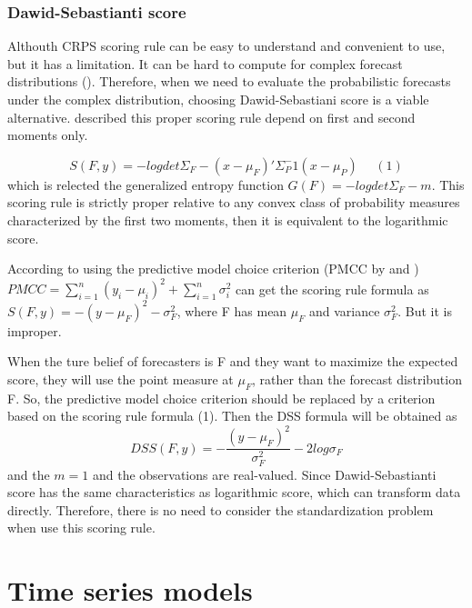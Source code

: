 \documentclass{monashthesis}
\theoremstyle{definition}
\theoremstyle{definition}
\theoremstyle{definition}
\theoremstyle{remark}
\begin{document}
\subsection{Dawid-Sebastianti score}\label{dawid-sebastianti-score}

Althouth CRPS scoring rule can be easy to understand and convenient to
use, but it has a limitation. It can be hard to compute for complex
forecast distributions (\textcite{GK14}). Therefore, when we need to
evaluate the probabilistic forecasts under the complex distribution,
choosing Dawid-Sebastiani score is a viable alternative. \textcite{DS99}
described this proper scoring rule depend on first and second moments
only.

\[S(F,y)=-logdet\Sigma_F-(x-\mu_F)'\Sigma_P^-1(x-\mu_P)~~~~~~(1)\] which
is relected the generalized entropy function \(G(F)=-logdet\Sigma_F-m\).
This scoring rule is strictly proper relative to any convex class of
probability measures characterized by the first two moments, then it is
equivalent to the logarithmic score.

According to \textcite{GR07} using the predictive model choice criterion
(PMCC by \textcite{LI95} and \textcite{GG98})
\(PMCC=\sum_{i=1}^{n}(y_i-\mu_i)^2+\sum_{i=1}^{n}\sigma_i^2\) can get
the scoring rule formula as \(S(F,y)=-(y-\mu_F)^2-\sigma_F^2\), where F
has mean \(\mu_F\) and variance \(\sigma_F^2\). But it is improper.

When the ture belief of forecasters is F and they want to maximize the
expected score, they will use the point measure at \(\mu_F\), rather
than the forecast distribution F. So, the predictive model choice
criterion should be replaced by a criterion based on the scoring rule
formula (1). Then the DSS formula will be obtained as \[
     DSS(F,y)=-\frac{(y-\mu_F)^2}{\sigma_F^2}-2log\sigma_F
  \] and the \(m=1\) and the observations are real-valued. Since
Dawid-Sebastianti score has the same characteristics as logarithmic
score, which can transform data directly. Therefore, there is no need to
consider the standardization problem when use this scoring rule.

\chapter{Time series models}\label{time-series-models}
\end{document}
